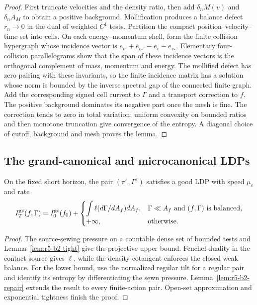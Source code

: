 \begin{proof}
First truncate velocities and the density ratio, then add
\(\delta_nM(v)\) and \(\delta_nA_M\) to obtain a positive background.
Mollification produces a balance defect \(r_n\to0\) in the dual of weighted
\(C^1\) tests.  Partition the compact position--velocity--time set into cells.
On each energy--momentum shell, form the finite collision hypergraph whose
incidence vector is
\(e_{v'}+e_{v_*'}-e_v-e_{v_*}\).  Elementary four-collision parallelograms
show that the span of these incidence vectors is the orthogonal complement of
mass, momentum and energy.  The mollified defect has zero pairing with these
invariants, so the finite incidence matrix has a solution whose norm is
bounded by the inverse spectral gap of the connected finite graph.  Add the
corresponding signed cell current to \(\Gamma\) and a transport correction to
\(f\).  The positive background dominates its negative part once the mesh is
fine.  The correction tends to zero in total variation; uniform convexity on
bounded ratios and then monotone truncation give convergence of the entropy.
A diagonal choice of cutoff, background and mesh proves the lemma.
\end{proof}

\subsection{The grand-canonical and microcanonical LDPs}

\begin{theorem}
\label{thm:r5-b2-gc-ldp}
On the fixed short horizon, the pair
\((\pi^\varepsilon,\Gamma^\varepsilon)\) satisfies a good LDP with speed
\(\mu_\varepsilon\) and rate
\[
 I_T^{\rm gc}(f,\Gamma)=I_0^{\rm gc}(f_0)+
 \begin{cases}
 \displaystyle\int\ell(d\Gamma/dA_f)dA_f,
 &\Gamma\ll A_f\text{ and }(f,\Gamma)\text{ is balanced},\\[1ex]
 +\infty,&\text{otherwise}.
 \end{cases}
\]
\end{theorem}

\begin{proof}
The source-sewing pressure on a countable dense set of bounded tests and
Lemma~\ref{lem:r5-b2-tight} give the projective upper bound.  Fenchel duality
in the contact source gives \(\ell\), while the density cotangent enforces the
closed weak balance.  For the lower bound, use the normalized regular tilt for
a regular pair and identify its entropy by differentiating the sewn pressure.
Lemma~\ref{lem:r5-b2-repair} extends the result to every finite-action pair.
Open-set approximation and exponential tightness finish the proof.
\end{proof}

